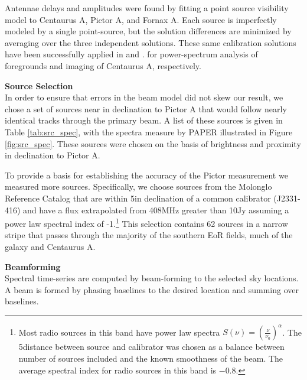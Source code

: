 \documentclass[preprint]{aastex}
\begin{document}
Antennae delays and amplitudes were found by fitting a point source visibility
model to Centaurus A, Pictor A, and Fornax A.  Each source is imperfectly
modeled by a single point-source, but the solution differences are minimized by
averaging over the three independent solutions. These same calibration
solutions have been successfully applied in \citet{Pober:2013XXX} and \citet{Stefan:2013:XXX}.
for power-spectrum analysis of foregrounds and imaging of Centaurus A, respectively.


\textbf{Source Selection}\\

In order to ensure that errors in
the beam model did not skew our result, we chose a set of sources near in declination
to Pictor A that would follow nearly identical tracks through the primary beam.
A list of these 
sources is given in Table \ref{tab:src_spec}, with the spectra measure by PAPER
illustrated in Figure \ref{fig:src_spec}.  These sources were chosen on the basis of brightness and
proximity in declination to Pictor A.

To provide a basis for establishing the accuracy of the Pictor measurement we
measured more sources.  Specifically, we choose sources from the Molonglo
Reference Catalog \cite[MRC]{Large:1981p7798} that are within 5\arcdeg in
declination of a common calibrator (J2331-416) and have a flux extrapolated
from 408MHz greater than 10Jy assuming a power law spectral index of
-1.\footnote{Most radio sources in this band have power law spectra $S(\nu) =
\left(\frac{\nu}{\nu_0}\right)^\alpha$.  The 5\arcdeg distance between source
and calibrator was chosen as a balance between number of sources included and
the known smoothness of the beam.   The average spectral index for radio
sources in this band is $-0.8$.} This selection contains 62 sources in a narrow
stripe that passes through the majority of the southern EoR fields, much of the
galaxy and Centaurus A.



\textbf{Beamforming}\\

Spectral time-series are computed by beam-forming to the selected sky
locations. A beam is formed by phasing baselines to the desired location and
summing over baselines.  
\end{document}
